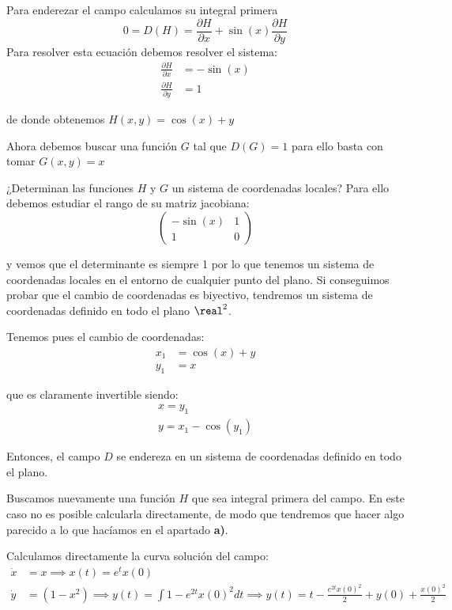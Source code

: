 \begin{problem}[5]
\spart

Para enderezar el campo calculamos su integral primera
\[0 = D(H) = \frac{\partial H}{\partial x}+\sin(x)\frac{\partial H}{\partial y}\]
Para resolver esta ecuación debemos resolver el sistema:
\begin{align}
\frac{\partial H}{\partial x} &= -\sin(x)\\
\frac{\partial H}{\partial y} &= 1
\end{align}

de donde obtenemos $H(x,y)=\cos(x)+y$

Ahora debemos buscar una función $G$ tal que $D(G)=1$ para ello basta con tomar $G(x,y)=x$

¿Determinan las funciones $H$ y $G$ un sistema de coordenadas locales? Para ello debemos estudiar el rango de su matriz jacobiana:
\[\left( \begin{array}{cc}
-\sin(x) & 1  \\
1 & 0  \end{array} \right)\]

y vemos que el determinante es siempre 1 por lo que tenemos un sistema de coordenadas locales en el entorno de cualquier punto del plano. Si conseguimos probar que el cambio de coordenadas es biyectivo, tendremos un sistema de coordenadas definido en todo el plano $\real^2$.

Tenemos pues el cambio de coordenadas:
\begin{align}
x_1 &= \cos(x)+y\\
y_1 &= x
\end{align}

que es claramente invertible siendo:
\begin{align}
x = y_1\\
y = x_1 - \cos(y_1)
\end{align}

Entonces, el campo $D$ se endereza en un sistema de coordenadas definido en todo el plano.

\spart
\yoP

Buscamos nuevamente una función $H$ que sea integral primera del campo. En este caso no es posible calcularla directamente, de modo que tendremos que hacer algo parecido a lo que hacíamos en el apartado \textbf{a)}.

Calculamos directamente la curva solución del campo:
\begin{align}
\dot{x}&=x \implies x(t)=e^tx(0)\\
\dot{y}&=(1-x^2) \implies y(t)=\int 1-e^{2t}x(0)^2 dt \implies y(t)=t-\frac{e^{2t}x(0)^2}{2}+y(0)+\frac{x(0)^2}{2}
\end{align}


\end{problem}

